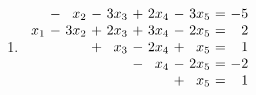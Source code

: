 \documentclass{article}
\begin{document}
\begin{enumerate}
\item 
$\begin{array}{r@{\ }c@{\ }r@{\ }c@{\ }r@{\ }c@{\ }r@{\ }c@{\ }r@{\ }c@{\ }r@{\ }c@{\ }}
& -& x_{2}& -& 3x_{3}& +& 2x_{4}& -& 3x_{5}&=&-5 \\
 x_{1}& -& 3x_{2}& +& 2x_{3}& +& 3x_{4}& -& 2x_{5}&=&2 \\
 &&& +& x_{3}& -& 2x_{4}& +& x_{5}&=&1 \\
 &&&&& -& x_{4}& -& 2x_{5}&=&-2 \\
 &&&&&&& +& x_{5}&=&1 \\
 \end{array}$
\end{enumerate}
\end{document}
